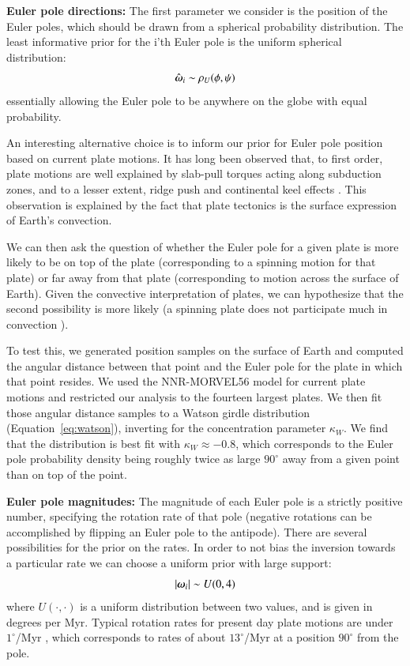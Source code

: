 \documentclass[preprint,12pt,authoryear]{elsarticle}
\newcommand{\mitbf}[1]{\hbox{\mathversion{bold}$#1$}}
\begin{document}
\textbf{Euler pole directions:} 
The first parameter we consider is the position of the Euler poles, which should be drawn
from a spherical probability distribution.
The least informative prior for the i'th Euler pole is the uniform spherical distribution:
\begin{equation}
\hat{\mitbf{\omega}}_i \sim \rho_U(\phi, \psi)
\end{equation}
essentially allowing the Euler pole to be anywhere on the globe with equal probability.

An interesting alternative choice is to inform our prior for Euler pole position based
on current plate motions. It has long been observed that, to first order, plate motions
are well explained by slab-pull torques acting along subduction zones, and to a lesser
extent, ridge push and continental keel effects \citep{forsyth1975relative, gordon1978absolute, richardson1992ridge}.
This observation is explained by the fact that plate tectonics is the 
surface expression of Earth's convection.

We can then ask the question of whether the Euler pole for a given plate is more likely
to be on top of the plate (corresponding to a spinning motion for that plate) or far away
from that plate (corresponding to motion across the surface of Earth).
Given the convective interpretation of plates, we can hypothesize that the second possibility
is more likely (a spinning plate does not participate much in convection \citep{forte1987plate, gable1991convection}).

To test this, we generated position samples on the surface of Earth and computed
the angular distance between that point and the Euler pole for the plate in which that point resides.
We used the NNR-MORVEL56 model for current plate motions \cite{argus2011geologically}
and restricted our analysis to the fourteen largest plates.
We then fit those angular distance samples to a Watson girdle distribution (Equation~\eqref{eq:watson}), 
inverting for the concentration parameter $\kappa_W$.
We find that the distribution is best fit with $\kappa_W \approx -0.8$, which corresponds
to the Euler pole probability density being roughly twice as large $90^\circ$
away from a given point than on top of the point.

\textbf{Euler pole magnitudes:} 
The magnitude of each Euler pole is a strictly positive number, specifying the
rotation rate of that pole (negative rotations can be accomplished by flipping an Euler
pole to the antipode).
There are several possibilities for the prior on the rates.
In order to not bias the inversion towards a particular
rate we can choose a uniform prior with large support:
\begin{equation}
\vert \mitbf{\omega}_i \vert \sim U(0, 4)
\end{equation}
where $U(\cdot, \cdot)$ is a uniform distribution between two values, and is given
in degrees per Myr. Typical rotation rates for present day plate motions
are under $1^\circ$/Myr \citep{argus2011geologically}, which corresponds to rates
of about $13^\circ$/Myr at a position $90^\circ$ from the pole.
\end{document}
